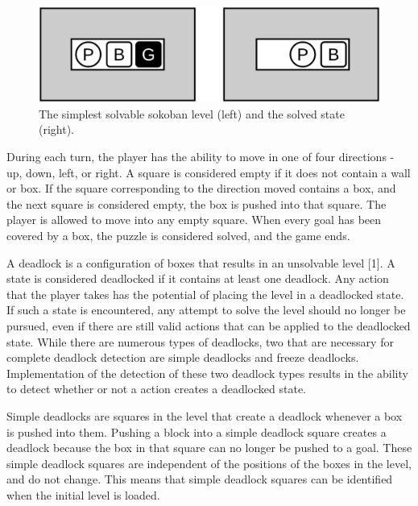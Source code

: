 \documentclass[times, 10pt,twocolumn]{article}
\begin{document}
\begin{figure}[h] 
  \centering
     \includegraphics[width=0.7\linewidth]{images/basic_unsolved_solved.png}
  \caption{The simplest solvable sokoban level (left) and the solved state (right).}
  \label{fig:b}
\end{figure}


During each turn, the player has the ability to move in one of four directions - up, down, left, or right. A square is considered empty if it does not contain a wall or box. If the square corresponding to the direction moved contains a box, and the next square is considered empty, the box is pushed into that square. The player is allowed to move into any empty square. When every goal has been covered by a box, the puzzle is considered solved, and the game ends.


A deadlock is a configuration of boxes that results in an unsolvable level [1]. A state is considered deadlocked if it contains at least one deadlock. Any action that the player takes has the potential of placing the level in a deadlocked state. If such a state is encountered, any attempt to solve the level should no longer be pursued, even if there are still valid actions that can be applied to the deadlocked state. While there are numerous types of deadlocks, two that are necessary for complete deadlock detection are simple deadlocks and freeze deadlocks. Implementation of the detection of these two deadlock types results in the ability to detect whether or not a action creates a deadlocked state. 


Simple deadlocks are squares in the level that create a deadlock whenever a box is pushed into them. Pushing a block into a simple deadlock square creates a deadlock because the box in that square can no longer be pushed to a goal. These simple deadlock squares are independent of the positions of the boxes in the level, and do not change. This means that simple deadlock squares can be identified when the initial level is loaded. 
\end{document}
